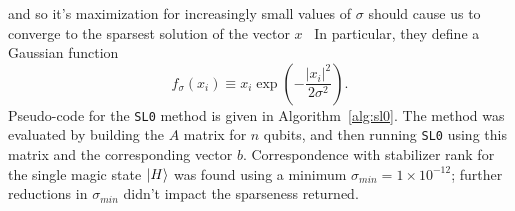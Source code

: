 \documentclass{standalone}
\begin{document}
and so it's maximization for increasingly small values of $\sigma$ should cause us to converge to the sparsest solution of the vector $x$~\cite{Mohimani2009} In particular, they define a Gaussian function~\cite{Mohimani2009}
\begin{equation}\label{eq:fxi}
    f_{\sigma}(x_{i})\equiv x_{i}\exp\left(-\frac{\vert x_{i}\vert^{2}}{2\sigma^{2}} \right).
\end{equation}
Pseudo-code for the \texttt{SL0} method is given in Algorithm~\ref{alg:sl0}. The method was evaluated by building the $A$ matrix for $n$ qubits, and then running \texttt{SL0} using this matrix and the corresponding vector $b$. Correspondence with stabilizer rank for the single magic state $\ket{H}$ was found using a minimum $\sigma_{min}=1\times 10^{-12}$; further reductions in $\sigma_{min}$ didn't impact the sparseness returned. 
\end{document}
